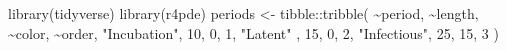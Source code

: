 \documentclass[
  letterpaper,
]{book}
\newenvironment{Shaded}{\begin{snugshade}}{\end{snugshade}}
\newcommand{\DecValTok}[1]{\textcolor[rgb]{0.68,0.00,0.00}{#1}}
\newcommand{\FunctionTok}[1]{\textcolor[rgb]{0.28,0.35,0.67}{#1}}
\newcommand{\NormalTok}[1]{\textcolor[rgb]{0.00,0.23,0.31}{#1}}
\newcommand{\OtherTok}[1]{\textcolor[rgb]{0.00,0.23,0.31}{#1}}
\newcommand{\SpecialCharTok}[1]{\textcolor[rgb]{0.37,0.37,0.37}{#1}}
\newcommand{\StringTok}[1]{\textcolor[rgb]{0.13,0.47,0.30}{#1}}
\begin{document}
\begin{Shaded}
\begin{Highlighting}[]
\FunctionTok{library}\NormalTok{(tidyverse)}
\FunctionTok{library}\NormalTok{(r4pde)}
\NormalTok{periods }\OtherTok{\textless{}{-}}\NormalTok{ tibble}\SpecialCharTok{::}\FunctionTok{tribble}\NormalTok{(}
  \SpecialCharTok{\textasciitilde{}}\NormalTok{period, }\SpecialCharTok{\textasciitilde{}}\NormalTok{length, }\SpecialCharTok{\textasciitilde{}}\NormalTok{color, }\SpecialCharTok{\textasciitilde{}}\NormalTok{order,}
  \StringTok{"Incubation"}\NormalTok{, }\DecValTok{10}\NormalTok{, }\DecValTok{0}\NormalTok{, }\DecValTok{1}\NormalTok{,}
  \StringTok{"Latent"}\NormalTok{ , }\DecValTok{15}\NormalTok{, }\DecValTok{0}\NormalTok{, }\DecValTok{2}\NormalTok{,}
  \StringTok{"Infectious"}\NormalTok{, }\DecValTok{25}\NormalTok{, }\DecValTok{15}\NormalTok{, }\DecValTok{3}
\NormalTok{)}


\end{Highlighting}
\end{Shaded}
\end{document}
